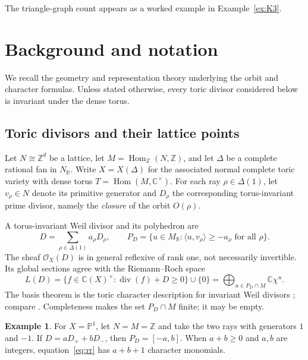 \documentclass[12pt,letterpaper]{article}
\theoremstyle{definition}
\newtheorem{example}[theorem]{Example}
\theoremstyle{remark}
\numberwithin{equation}{section}
\DeclareMathOperator{\Hom}{Hom}
\DeclareMathOperator{\divisor}{div}
\newcommand{\CC}{\mathbb C}
\newcommand{\ZZ}{\mathbb Z}
\newcommand{\RR}{\mathbb R}
\newcommand{\calO}{\mathcal O}
\begin{document}
The triangle-graph count appears as a worked example in Example~\ref{ex:K3}.

\section{Background and notation}\label{sec:background}
We recall the geometry and representation theory underlying the orbit and character formulas. Unless stated otherwise, every toric divisor considered below is invariant under the dense torus.

\subsection{Toric divisors and their lattice points}
Let $N\cong\ZZ^d$ be a lattice, let $M=\Hom_{\ZZ}(N,\ZZ)$, and let $\Delta$ be a complete rational fan in $N_{\RR}$. Write $X=X(\Delta)$ for the associated normal complete toric variety with dense torus $T=\Hom(M,\CC^\times)$. For each ray $\rho\in\Delta(1)$, let $v_\rho\in N$ denote its primitive generator and $D_\rho$ the corresponding torus-invariant prime divisor, namely the \emph{closure} of the orbit $O(\rho)$.

A torus-invariant Weil divisor and its polyhedron are
\begin{equation}\label{eq:polytope}
D=\sum_{\rho\in\Delta(1)} a_\rho D_\rho,
\qquad
P_D=\{u\in M_{\RR}:\langle u,v_\rho\rangle\geq-a_\rho
\text{ for all }\rho\}.
\end{equation}
The sheaf $\calO_X(D)$ is in general reflexive of rank one, not necessarily invertible. Its global sections agree with the Riemann--Roch space
\begin{equation}\label{eq:rr}
L(D)=\{f\in\CC(X)^\times:\divisor(f)+D\geq0\}\cup\{0\}
=\bigoplus_{u\in P_D\cap M}\CC\chi^u.
\end{equation}
The basis theorem is the toric character description for invariant Weil divisors \cite[Proposition~4.3.3]{CLS11}; compare \cite[Section~3.4]{Fu93}. Completeness makes the set $P_D\cap M$ finite; it may be empty.

\begin{example}\label{ex:p1}
For $X=\mathbb P^1$, let $N=M=\ZZ$ and take the two rays with generators $1$ and $-1$. If $D=aD_++bD_-$, then $P_D=[-a,b]$. When $a+b\geq0$ and $a,b$ are integers, equation~\eqref{eq:rr} has $a+b+1$ character monomials.
\end{example}
\end{document}

